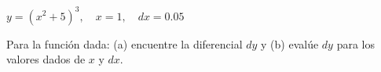 \item $y = (x^2 + 5)^3, \quad x = 1, \quad dx = 0.05$
\par
Para la función dada: (a) encuentre la diferencial $dy$ y (b) evalúe $dy$ para los valores dados de $x$ y $dx$.
